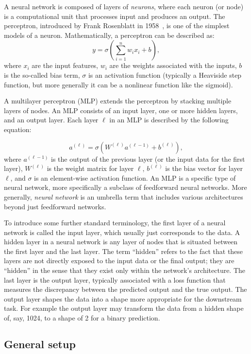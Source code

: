 A neural network is  composed of layers of {\em neurons}, where each neuron (or node) is a computational unit that processes input and produces an output.
The perceptron, introduced by Frank Rosenblatt in 1958~\cite{Rosenblatt}, is one of the simplest models of a neuron. Mathematically, a perceptron can be described as:
$$
y = \sigma \left(\sum_{i=1}^n w_i x_i + b\right),
$$
where  $x_i$ are the input features, $w_i$ are the weights associated with the inputs, $b$ is the so-called bias term, $\sigma$ is an activation function (typically a Heaviside step function, but more generally it can be a nonlinear function like the sigmoid).



A multilayer perceptron (MLP) extends the perceptron by stacking multiple layers of nodes. An MLP consists of an input layer, one or more hidden layers, and an output layer. Each layer $ \ell $ in an MLP is described by the following equation:

$$
a^{(\ell)} = \sigma\left(W^{(\ell)} a ^{(\ell-1)} + b^{(\ell)}\right),
$$
where $ a^{(\ell-1)}$ is the output of the previous layer (or the input data for the first layer),
$W^{(\ell)}$ is the weight matrix for layer $ \ell $,
$b^{(\ell)}$ is the bias vector for layer $\ell$,
and $ \sigma$ is an element-wise activation function. 
An MLP is a specific type of neural network, more specifically a subclass of feedforward neural networks. More generally, {\em neural network} is an umbrella term that includes various architectures beyond just feedforward networks.

To introduce some further standard terminology, the first layer of a neural network is called the input layer, which usually just corresponds to the data. A hidden layer in a neural network is any layer of nodes that is situated between the first layer and the last layer. The term ``hidden'' refers to the fact that these layers are not directly exposed to the input data or the final output; they are ``hidden'' in the sense that they exist only within the network's architecture.
The last layer is the output layer, typically associated with a loss function that measures the discrepancy between the predicted output and the true output.
 The output layer shapes the data into a shape more appropriate for the downstream task. For example the output layer may transform the data from a hidden shape of, say, 1024, to a shape of 2 for a binary prediction.

\subsection{General setup}

